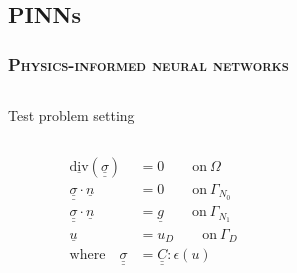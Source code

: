 \documentclass[aspectratio=1610, 10pt]{beamer}
\def\doubleunderline#1{\underline{\underline{#1}}}
\begin{document}
\subsection{PINNs}
 \begin{frame}
    \frametitle{\textsc{Physics-informed neural networks}}

    \begin{columns}
    \begin{column}{0.6\textwidth}
    
    \begin{blueblockshadow}{Test problem setting}
    \begin{columns}
    \begin{column}{0.6\textwidth}
    \scriptsize{
    \begin{align*}
	\underline{\mathrm{div}}  (\doubleunderline{ \sigma})  &= 0 \qquad \mathrm{on} \ \Omega \\
	\doubleunderline{ \sigma} \cdot \underline{n} &= 0 \qquad \mathrm{on} \ \Gamma_{N_0} \\
	\doubleunderline{ \sigma} \cdot \underline{n} &= \underline{g} \qquad \mathrm{on} \ \Gamma_{N_1} \\
        \underline{u} &= u_D \qquad \mathrm{on} \  \Gamma_ D\\
	\mathrm{where} \quad \doubleunderline{ \sigma} &= \doubleunderline{C}:\epsilon(u)
    \end{align*}}
    \end{column}
    \begin{column}{0.4\textwidth}
        \begin{figure}
        \centering

\end{figure}
\end{column}
\end{columns}
\end{blueblockshadow}
\end{column}
\end{columns}
\end{frame}
\end{document}
